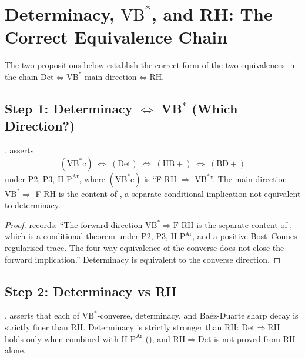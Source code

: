 \section{Determinacy, \(\mathrm{VB}^{*}\), and RH: The Correct Equivalence Chain}
\label{v4-arith:r-audit:chain-audit}

The two propositions below establish the correct form of the two
equivalences in the chain
\(\mathrm{Det}\Leftrightarrow\mathrm{VB}^{*}\text{ main direction}\Leftrightarrow\mathrm{RH}\).

\subsection{Step 1: Determinacy \(\Leftrightarrow\) VB\(^{*}\) (Which Direction?)}
\label{v4-arith:r-audit:step-1}

\begin{proposition}
\label{v4-arith:r-audit:prop:det-converse-not-main}
\ClaimStatusProvedHere.
asserts
\[
(\mathrm{VB^{*}c})\;\Leftrightarrow\;(\mathrm{Det})\;\Leftrightarrow\;
(\mathrm{HB+})\;\Leftrightarrow\;(\mathrm{BD+})
\]
under P2, P3, \(\mathrm{H\text{-}P}^{\mathrm{Ar}}\), where
\((\mathrm{VB^{*}c})\) is ``F-RH \(\Rightarrow\) \(\mathrm{VB}^{*}\)''.
The main direction \(\mathrm{VB}^{*}\Rightarrow\) F-RH is the content
of , a separate conditional
implication not equivalent to determinacy.
\end{proposition}

\begin{proof}
 records:
``The forward direction \(\mathrm{VB}^{*}\Rightarrow\mathrm{F\text{-}RH}\)
is the separate content of ,
which is a conditional theorem under P2, P3,
\(\mathrm{H\text{-}P}^{\mathrm{Ar}}\), and a positive Bost--Connes
regularised trace. The four-way equivalence of the converse does not
close the forward implication.'' Determinacy is equivalent to the
converse direction.
\end{proof}

\subsection{Step 2: Determinacy vs RH}
\label{v4-arith:r-audit:step-2}

\begin{proposition}
\label{v4-arith:r-audit:prop:det-strictly-finer}
\ClaimStatusProvedHere.
 asserts that each
of \(\mathrm{VB}^{*}\)-converse, determinacy, and
Ba\'ez-Duarte sharp decay is strictly finer than RH. Determinacy is
strictly stronger than RH: \(\mathrm{Det}\Rightarrow\mathrm{RH}\)
holds only when combined with \(\mathrm{H\text{-}P}^{\mathrm{Ar}}\)
(), and
\(\mathrm{RH}\Rightarrow\mathrm{Det}\) is not proved from RH alone.
\end{proposition}

